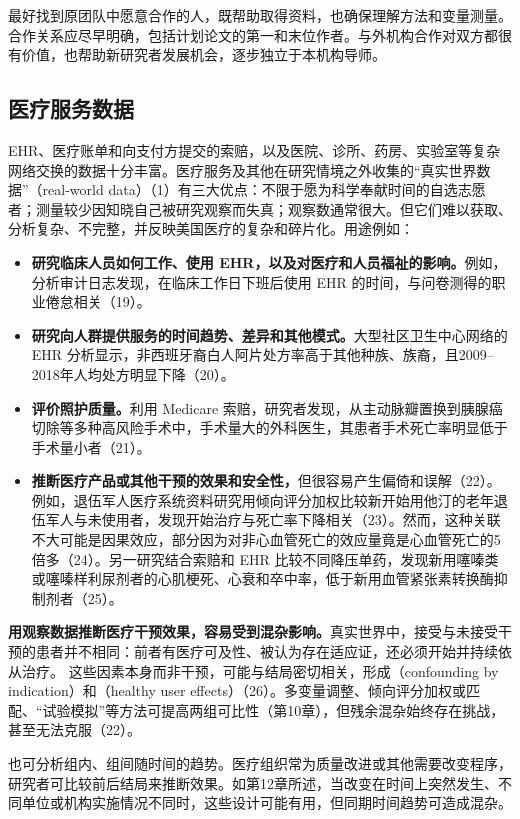 最好找到原团队中愿意合作的人，既帮助取得资料，也确保理解方法和变量测量。合作关系应尽早明确，包括计划论文的第一和末位作者。与外机构合作对双方都很有价值，也帮助新研究者发展机会，逐步独立于本机构导师。

\subsection{医疗服务数据}
EHR、医疗账单和向支付方提交的索赔，以及医院、诊所、药房、实验室等复杂网络交换的数据十分丰富。医疗服务及其他在研究情境之外收集的“真实世界数据”（real-world data）（1）有三大优点：不限于愿为科学奉献时间的自选志愿者；测量较少因知晓自己被研究观察而失真；观察数通常很大。但它们难以获取、分析复杂、不完整，并反映美国医疗的复杂和碎片化。用途例如：
\begin{itemize}
\item \textbf{研究临床人员如何工作、使用 EHR，以及对医疗和人员福祉的影响。}例如，分析审计日志发现，在临床工作日下班后使用 EHR 的时间，与问卷测得的职业倦怠相关（19）。
\item \textbf{研究向人群提供服务的时间趋势、差异和其他模式。}大型社区卫生中心网络的 EHR 分析显示，非西班牙裔白人阿片处方率高于其他种族、族裔，且2009--2018年人均处方明显下降（20）。
\item \textbf{评价照护质量。}利用 Medicare 索赔，研究者发现，从主动脉瓣置换到胰腺癌切除等多种高风险手术中，手术量大的外科医生，其患者手术死亡率明显低于手术量小者（21）。
\item \textbf{推断医疗产品或其他干预的效果和安全性，}但很容易产生偏倚和误解（22）。例如，退伍军人医疗系统资料研究用倾向评分加权比较新开始用他汀的老年退伍军人与未使用者，发现开始治疗与死亡率下降相关（23）。然而，这种关联不大可能是因果效应，部分因为对非心血管死亡的效应量竟是心血管死亡的5倍多（24）。另一研究结合索赔和 EHR 比较不同降压单药，发现新用噻嗪类或噻嗪样利尿剂者的心肌梗死、心衰和卒中率，低于新用血管紧张素转换酶抑制剂者（25）。
\end{itemize}

\textbf{用观察数据推断医疗干预效果，容易受到混杂影响。}真实世界中，接受与未接受干预的患者并不相同：前者有医疗可及性、被认为存在适应证，还必须开始并持续依从治疗。
这些因素本身而非干预，可能与结局密切相关，形成（confounding by indication）和（healthy user effects）（26）。多变量调整、倾向评分加权或匹配、“试验模拟”等方法可提高两组可比性（第10章），但残余混杂始终存在挑战，甚至无法克服（22）。

也可分析组内、组间随时间的趋势。医疗组织常为质量改进或其他需要改变程序，研究者可比较前后结局来推断效果。如第12章所述，当改变在时间上突然发生、不同单位或机构实施情况不同时，这些设计可能有用，但同期时间趋势可造成混杂。

